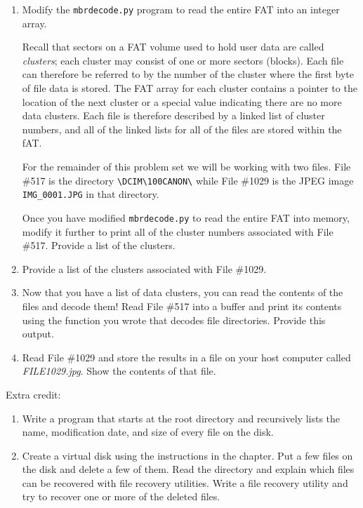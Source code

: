 \documentclass{article}
\begin{document}
\begin{enumerate}
\item Modify the \texttt{mbrdecode.py} program to read the
  entire FAT into an integer array. 

  Recall that sectors on a FAT volume used to hold user data are
  called \emph{clusters};  each cluster may consist of one or
  more sectors (blocks). Each file can therefore be referred to by the
  number of the cluster where the first byte of file data is
  stored. The FAT array for each cluster contains a pointer to the
  location of the next cluster or a special value indicating there are
  no more data clusters. Each file is therefore described by a linked
  list of cluster numbers, and all of the linked lists for all of the
  files are stored within the fAT.

  For the remainder of this problem set we will be working with two
  files. File \#517 is the
  directory \verb|\DCIM\100CANON\| while File \#1029 is the JPEG image
  \verb|IMG_0001.JPG| in that directory.

  Once you have modified \texttt{mbrdecode.py} to read the entire FAT
  into memory, modify it further to print all of the cluster numbers 
  associated with File \#517. Provide a list of the clusters.

\item Provide a list of the clusters associated with File \#1029.

\item Now that you have a list of data clusters, you can read the
  contents of the files and decode them!  Read File \#517 into a
  buffer and print its contents using the function you wrote that
  decodes file directories. Provide this output.

\item Read File \#1029 and store the results in a file on your host
  computer called \emph{FILE1029.jpg}. Show the contents of that file.

\end{enumerate}
  
Extra credit:


\begin{enumerate}
\item Write a program that starts at the root
  directory and recursively lists the name, modification date, and
  size of every file on the disk.
\item Create a virtual disk using the instructions in the chapter. Put
  a few files on the disk and delete a few of them. Read the directory
  and explain which files can be recovered with file recovery
  utilities. Write a file recovery utility and try to recover one or
  more of the deleted files.
\end{enumerate}
\end{document}
